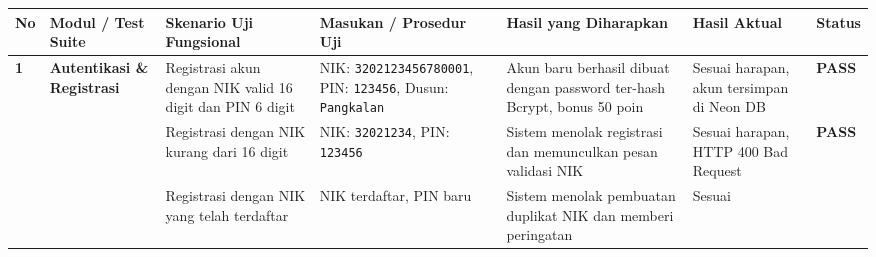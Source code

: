 \documentclass[
  indonesian,
  12pt,
]{report}
\newcounter{none} %
\begin{document}
{\def\LTcaptype{none} %
\begin{longtable}[]{@{}
  >{\centering\arraybackslash}p{}
  >{\raggedright\arraybackslash}p{}
  >{\raggedright\arraybackslash}p{}
  >{\raggedright\arraybackslash}p{}
  >{\raggedright\arraybackslash}p{}
  >{\raggedright\arraybackslash}p{}
  >{\centering\arraybackslash}p{}@{}}
\toprule\noalign{}
\begin{minipage}[b]{\linewidth}\centering
No
\end{minipage} & \begin{minipage}[b]{\linewidth}\raggedright
Modul / Test Suite
\end{minipage} & \begin{minipage}[b]{\linewidth}\raggedright
Skenario Uji Fungsional
\end{minipage} & \begin{minipage}[b]{\linewidth}\raggedright
Masukan / Prosedur Uji
\end{minipage} & \begin{minipage}[b]{\linewidth}\raggedright
Hasil yang Diharapkan
\end{minipage} & \begin{minipage}[b]{\linewidth}\raggedright
Hasil Aktual
\end{minipage} & \begin{minipage}[b]{\linewidth}\centering
Status
\end{minipage} \\
\midrule\noalign{}
\endhead
\bottomrule\noalign{}
\endlastfoot
\textbf{1} & \textbf{Autentikasi \& Registrasi} & Registrasi akun dengan
NIK valid 16 digit dan PIN 6 digit & NIK: \texttt{3202123456780001},
PIN: \texttt{123456}, Dusun: \texttt{Pangkalan} & Akun baru berhasil
dibuat dengan password ter-hash Bcrypt, bonus 50 poin & Sesuai harapan,
akun tersimpan di Neon DB & \textbf{PASS} \\
& & Registrasi dengan NIK kurang dari 16 digit & NIK: \texttt{32021234},
PIN: \texttt{123456} & Sistem menolak registrasi dan memunculkan pesan
validasi NIK & Sesuai harapan, HTTP 400 Bad Request & \textbf{PASS} \\
& & Registrasi dengan NIK yang telah terdaftar & NIK terdaftar, PIN baru
& Sistem menolak pembuatan duplikat NIK dan memberi peringatan & Sesuai

\end{longtable}}
\end{document}
